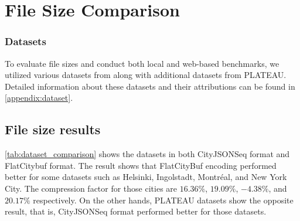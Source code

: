 \section{File Size Comparison}
\label{result:file_size_comparison}

\subsubsection{Datasets}
\label{result:overview:dataset}
To evaluate file sizes and conduct both local and web-based benchmarks, we utilized various datasets from \citet{ledoux_2024} along with additional datasets from PLATEAU. Detailed information about these datasets and their attributions can be found in \autoref{appendix:dataset}.

\subsection{File size results}
\label{result:overview:filesize_comparison}

\autoref{tab:dataset_comparison} shows the datasets in both CityJSONSeq format and FlatCitybuf format. The result shows that FlatCityBuf encoding performed better for some datasets such as Helsinki, Ingolstadt, Montréal, and New York City. The compression factor for those cities are $16.36\%$, $19.09\%$, $-4.38\%$, and $20.17\%$ respectively. On the other hands, PLATEAU datasets show the opposite result, that is, CityJSONSeq format performed better for those datasets.

